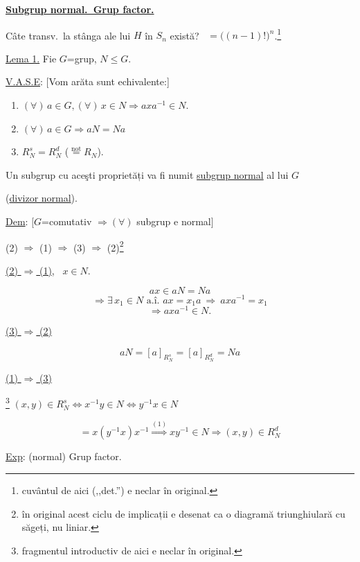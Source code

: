 \documentclass[12pt]{article}
\begin{document}
\noindent\underline{\textbf{Subgrup normal.\ Grup factor.}}

\bigskip
\noindent Câte transv.\ la stânga ale lui $H$ în $S_n$ există? \ $=\big((n-1)!\big)^n$.\footnote{cuvântul de aici (,,det.'') e neclar în original.}

\bigskip
\noindent\underline{Lema 1.} Fie $G$=grup, $N\leq G$.

\noindent\underline{V.A.S.E}: [Vom arăta sunt echivalente:]

\begin{enumerate}
\item[(1)] $(\forall)\, a\in G, (\forall)\, x\in N \Rightarrow axa^{-1}\in N$.
\item[(2)] $(\forall)\, a\in G \Rightarrow aN=Na$
\item[(3)] $R_N^s = R_N^d$ ($\overset{\text{not}}{=} R_N$).
\end{enumerate}

\noindent Un subgrup cu aceşti proprietăți va fi numit \underline{subgrup normal} al lui $G$

\noindent (\underline{divizor normal}).

\bigskip
\noindent\underline{Dem}: $\big[G$=comutativ $\Rightarrow (\forall)$ subgrup e normal$\big]$

\bigskip
\begin{center}
(2) $\Rightarrow$ (1) $\Rightarrow$ (3) $\Rightarrow$ (2)\footnote{în original acest ciclu de implicații e desenat ca o diagramă triunghiulară cu săgeți, nu liniar.}
\end{center}

\bigskip
\noindent\underline{(2) $\Rightarrow$ (1)}, \ $x\in N$.

\[
ax\in aN=Na
\]
\[
\Rightarrow \exists\, x_1\in N \text{ a.î. } ax=x_1a \ \Rightarrow \ axa^{-1}=x_1
\]
\[
\Rightarrow axa^{-1}\in N.
\]

\bigskip
\noindent\underline{(3) $\Rightarrow$ (2)}

\[
aN = [a]_{R_N^s} = [a]_{R_N^d} = Na
\]

\bigskip
\noindent\underline{(1) $\Rightarrow$ (3)}

\noindent\footnote{fragmentul introductiv de aici e neclar în original.} $(x,y)\in R_N^s \Leftrightarrow x^{-1}y\in N \Leftrightarrow y^{-1}x\in N$

\[
= x(y^{-1}x)x^{-1} \overset{(1)}{\Longrightarrow} xy^{-1}\in N \Rightarrow (x,y)\in R_N^d
\]

\bigskip
\noindent\underline{Exp}: (normal) Grup factor.
\end{document}
